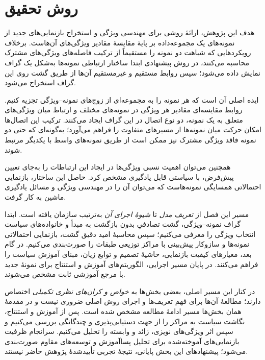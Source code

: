 \chapter{روش تحقیق}
\label{cmp:ch:method}
\begingroup
\renewcommand{\theequation}{\thechapter-\arabic{equation}}
\renewcommand{\thedefinition}{\thechapter-\arabic{definition}}

هدف این پژوهش، ارائهٔ روشی برای مهندسی ویژگی و استخراج بازنمایی‌های جدید از نمونه‌های یک مجموعه‌داده بر پایهٔ مقایسهٔ مقادیر ویژگی‌های آن‌هاست. برخلاف رویکردهایی که شباهت دو نمونه را مستقیماً از ترکیب فاصله‌های ویژگی‌های مشترک محاسبه می‌کنند، در روش پیشنهادی ابتدا ساختار ارتباطی نمونه‌ها به‌شکل یک گراف نمایش داده می‌شود؛ سپس روابط مستقیم و غیرمستقیم آن‌ها از طریق گشت روی این گراف استخراج می‌شود.

ایده اصلی آن است که هر نمونه را به مجموعه‌ای از زوج‌های نمونه--ویژگی تجزیه کنیم. روابط مقایسه‌ای مقادیر هر ویژگی در نمونه‌های مختلف و ارتباط میان ویژگی‌های متعلق به یک نمونه، دو نوع اتصال در این گراف ایجاد می‌کنند. ترکیب این اتصال‌ها امکان حرکت میان نمونه‌ها از مسیرهای متفاوت را فراهم می‌آورد؛ به‌گونه‌ای که حتی دو نمونه فاقد ویژگی مشترک نیز ممکن است از طریق نمونه‌های واسط با یکدیگر مرتبط شوند.

همچنین می‌توان اهمیت نسبی ویژگی‌ها در ایجاد این ارتباطات را به‌جای تعیین پیش‌فرض، با سیاستی قابل یادگیری مشخص کرد. حاصل این ساختار، بازنمایی احتمالاتی همسایگی نمونه‌هاست که می‌توان آن را در مهندسی ویژگی و مسائل یادگیری ماشین به کار گرفت.

مسیر این فصل از \emph{تعریف مدل} تا \emph{شیوهٔ اجرای آن}
به‌ترتیب سازمان یافته است. ابتدا گراف نمونه--ویژگی،
گشت تصادفیِ بدون بازگشت به مبدأ و خانواده‌های
سیاست انتخاب ویژگی را معرفی می‌کنیم؛ سپس
محاسبهٔ امید دقیق گشت، بازنمایی احتمالاتی نمونه‌ها
و سازوکار پیش‌بینی با مراکز توزیعی طبقات
را صورت‌بندی می‌کنیم. در گام بعد،
معیارهای کیفیت بازنمایی، حاشیهٔ تصمیم
و توابع زیان، مبنای آموزش سیاست را
فراهم می‌کنند. در پایان مسیر اجرایی،
الگوریتم‌های آموزش و استنتاج برای
نمونهٔ جدید با مرجع آموزشی ثابت
مشخص می‌شوند.

در کنار این مسیر اصلی، بعضی بخش‌ها به
\emph{خواص و کران‌های نظری تکمیلی}
اختصاص دارند؛ مطالعهٔ آن‌ها برای
فهم تعریف‌ها و اجرای روش اصلی
ضروری نیست و در مقدمهٔ همان بخش‌ها
مسیر ادامهٔ مطالعه مشخص شده است.
پس از آموزش و استنتاج، نگاشت سیاست
به مراکز را از جهت دستیابی‌پذیری و
چندگانگی بررسی می‌کنیم و سپس اثر
ویژگی‌های نویزی، زائد و وابسته را
تحلیل می‌کنیم. سرانجام ظرفیت
بازنمایی‌های آموخته‌شده برای
تحلیل پساآموزش و توسعه‌های مقاوم
صورت‌بندی می‌شود؛ پیشنهادهای
این بخش پایانی، نتیجهٔ تجربی
تأییدشدهٔ پژوهش حاضر نیستند.

